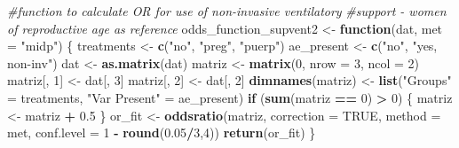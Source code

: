 \documentclass[
]{article}
\newenvironment{Shaded}{\begin{snugshade}}{\end{snugshade}}
\newcommand{\CommentTok}[1]{\textcolor[rgb]{0.56,0.35,0.01}{\textit{#1}}}
\newcommand{\ControlFlowTok}[1]{\textcolor[rgb]{0.13,0.29,0.53}{\textbf{#1}}}
\newcommand{\DataTypeTok}[1]{\textcolor[rgb]{0.13,0.29,0.53}{#1}}
\newcommand{\DecValTok}[1]{\textcolor[rgb]{0.00,0.00,0.81}{#1}}
\newcommand{\FloatTok}[1]{\textcolor[rgb]{0.00,0.00,0.81}{#1}}
\newcommand{\KeywordTok}[1]{\textcolor[rgb]{0.13,0.29,0.53}{\textbf{#1}}}
\newcommand{\NormalTok}[1]{#1}
\newcommand{\OperatorTok}[1]{\textcolor[rgb]{0.81,0.36,0.00}{\textbf{#1}}}
\newcommand{\OtherTok}[1]{\textcolor[rgb]{0.56,0.35,0.01}{#1}}
\newcommand{\StringTok}[1]{\textcolor[rgb]{0.31,0.60,0.02}{#1}}
\begin{document}
\begin{Shaded}
\begin{Highlighting}[]
\CommentTok{#function to calculate OR for use of non-invasive ventilatory}
\CommentTok{#support - women of reproductive age as reference}
\NormalTok{odds_function_supvent2 <-}\StringTok{ }\ControlFlowTok{function}\NormalTok{(dat, }\DataTypeTok{met =} \StringTok{"midp"}\NormalTok{) \{}
\NormalTok{  treatments <-}\StringTok{ }\KeywordTok{c}\NormalTok{(}\StringTok{"no"}\NormalTok{, }\StringTok{"preg"}\NormalTok{, }\StringTok{"puerp"}\NormalTok{)}
\NormalTok{  ae_present <-}\StringTok{ }\KeywordTok{c}\NormalTok{(}\StringTok{"no"}\NormalTok{, }\StringTok{"yes, non-inv"}\NormalTok{)}
\NormalTok{  dat <-}\StringTok{ }\KeywordTok{as.matrix}\NormalTok{(dat)}
\NormalTok{  matriz <-}\StringTok{ }\KeywordTok{matrix}\NormalTok{(}\DecValTok{0}\NormalTok{, }\DataTypeTok{nrow =} \DecValTok{3}\NormalTok{, }\DataTypeTok{ncol =} \DecValTok{2}\NormalTok{)}
\NormalTok{  matriz[, }\DecValTok{1}\NormalTok{] <-}\StringTok{ }\NormalTok{dat[, }\DecValTok{3}\NormalTok{]}
\NormalTok{  matriz[, }\DecValTok{2}\NormalTok{] <-}\StringTok{ }\NormalTok{dat[, }\DecValTok{2}\NormalTok{]}
  \KeywordTok{dimnames}\NormalTok{(matriz) <-}\StringTok{ }\KeywordTok{list}\NormalTok{(}\StringTok{"Groups"}\NormalTok{ =}\StringTok{ }\NormalTok{treatments,}
                           \StringTok{"Var Present"}\NormalTok{ =}\StringTok{ }\NormalTok{ae_present)}
  \ControlFlowTok{if}\NormalTok{ (}\KeywordTok{sum}\NormalTok{(matriz }\OperatorTok{==}\StringTok{ }\DecValTok{0}\NormalTok{) }\OperatorTok{>}\StringTok{ }\DecValTok{0}\NormalTok{) \{}
\NormalTok{    matriz <-}\StringTok{ }\NormalTok{matriz }\OperatorTok{+}\StringTok{ }\FloatTok{0.5}
\NormalTok{  \}}
\NormalTok{  or_fit <-}\StringTok{ }\KeywordTok{oddsratio}\NormalTok{(matriz, }\DataTypeTok{correction =} \OtherTok{TRUE}\NormalTok{, }\DataTypeTok{method =}\NormalTok{ met, }\DataTypeTok{conf.level =} \DecValTok{1} \OperatorTok{-}\StringTok{ }\KeywordTok{round}\NormalTok{(}\FloatTok{0.05}\OperatorTok{/}\DecValTok{3}\NormalTok{,}\DecValTok{4}\NormalTok{))}
  \KeywordTok{return}\NormalTok{(or_fit)}
\NormalTok{\}}


\end{Highlighting}
\end{Shaded}
\end{document}
